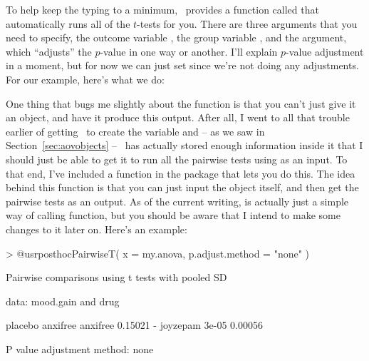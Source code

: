 To help keep the typing to a minimum, \R\ provides a function called  that automatically runs all of the $t$-tests for you. There are three arguments that you need to specify, the outcome variable , the group variable , and the  argument, which ``adjusts'' the $p$-value in one way or another. I'll explain $p$-value adjustment in a moment, but for now we can just set  since we're not doing any adjustments. For our example, here's what we do: 
One thing that bugs me slightly about the  function is that you can't just give it an  object, and have it produce this output. After all, I went to all that trouble earlier of getting \R\ to create the  variable and -- as we saw in Section~\ref{sec:aovobjects} -- \R\ has actually stored enough information inside it that I should just be able to get it to run all the pairwise tests using  as an input. To that end, I've included a  function in the  package that lets you do this. The idea behind this function is that you can just input the  object itself, and then get the pairwise tests as an output. As of the current writing,  is actually just a simple way of calling  function, but you should be aware that I intend to make some changes to it later on. Here's an example:
\begin{rblock1}
> @usr{posthocPairwiseT( x = my.anova, p.adjust.method = "none" )}

	Pairwise comparisons using t tests with pooled SD 

data:  mood.gain and drug  

         placebo anxifree
anxifree 0.15021 -       
joyzepam 3e-05   0.00056 

P value adjustment method: none 
\end{rblock1}
